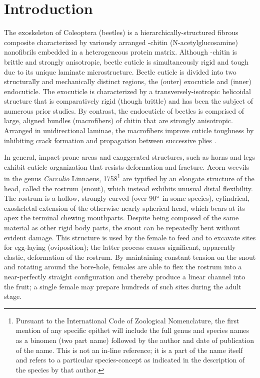 \documentclass[twocolumn, linenumbers, superscriptaddress, nofootinbib]{revtex4-1}
\begin{document}
\section*{Introduction} 
	{The exoskeleton of Coleoptera (beetles) is a hierarchically-structured fibrous composite characterized by variously arranged \textalpha-chitin (N-acetylglucosamine) nanofibrils embedded in a heterogeneous protein matrix.
	Although \textalpha-chitin is brittle and strongly anisotropic, beetle cuticle is simultaneously rigid and tough due to its unique laminate microstructure.
	Beetle cuticle is divided into two structurally and mechanically distinct regions, the (outer) exocuticle and (inner) endocuticle.
	The exocuticle is characterized by a transversely-isotropic helicoidal structure that is comparatively rigid (though brittle) and has been the subject of numerous prior studies.
	By contrast, the endocuticle of beetles is comprised of large, aligned bundles (macrofibers) of chitin that are strongly anisotropic.
	Arranged in unidirectional laminae, the macrofibers improve cuticle toughness by inhibiting crack formation and propagation between successive plies \cite{Kamp2010,Kamp2015,Hepburn1973}.
	
	In general, impact-prone areas and exaggerated structures, such as horns and legs exhibit cuticle organization that resists deformation and fracture.
	Acorn weevils in the genus \textit{Curculio} Linnaeus, 1758\footnote{Pursuant to the International Code of Zoological Nomenclature, the first mention of any specific epithet will include the full genus and species names as a binomen (two part name) followed by the author and date of publication of the name.
	This is not an in-line reference; it is a part of the name itself and refers to a particular species-concept as indicated in the description of the species by that author.} are typified by an elongate structure of the head, called the rostrum (snout), which instead exhibits unusual distal flexibility.
	The rostrum is a hollow, strongly curved (over 90$\degree$ in some species), cylindrical, exoskeletal extension of the otherwise nearly-spherical head, which bears at its apex the terminal chewing mouthparts.
	Despite being composed of the same material as other rigid body parts, the snout can be repeatedly bent without evident damage.
	This structure is used by the female to feed and to excavate sites for egg-laying (oviposition); the latter process causes significant, apparently elastic, deformation of the rostrum.
	By maintaining constant tension on the snout and rotating around the bore-hole, females are able to flex the rostrum into a near-perfectly straight configuration and thereby produce a linear channel into the fruit; a single female may prepare hundreds of such sites during the adult stage.
	
}
\end{document}
